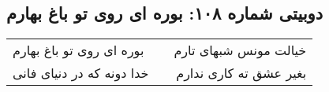 \begin{center}
\section*{دوبیتی شماره ۱۰۸: بوره ای روی تو باغ بهارم}
\label{sec:108}
\begin{longtable}{l p{0.5cm} r}
بوره ای روی تو باغ بهارم
&&
خیالت مونس شبهای تارم
\\
خدا دونه که در دنیای فانی
&&
بغیر عشق ته کاری ندارم
\\
\end{longtable}
\end{center}
